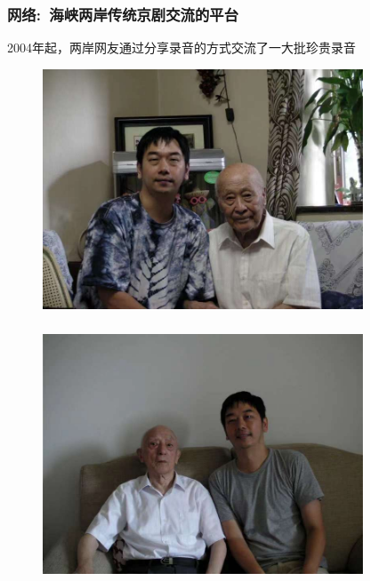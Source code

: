 \documentclass[cjk,slidestop,compress,mathserif,blue]{beamer}
\begin{document}
\frame
{
	\frametitle{网络:~海峡两岸传统京剧交流的平台}
	\textrm{2004}年起，两岸网友通过分享录音的方式交流了一大批珍贵录音
\begin{figure}[h!]
\centering
\vspace{-0.05in}
\includegraphics[height=0.6\textwidth,width=0.85\textwidth,clip]{Figures_Peking-Opera/PekOpe_Li-1.jpg}
\label{Li-1}
\end{figure}
}

\frame
{
	\frametitle{}
\begin{figure}[h!]
\centering
\vspace{-0.05in}
\includegraphics[height=0.6\textwidth,width=0.85\textwidth,clip]{Figures_Peking-Opera/PekOpe_Li-2.jpg}
\label{Li-2}
\end{figure}
}
\end{document}
